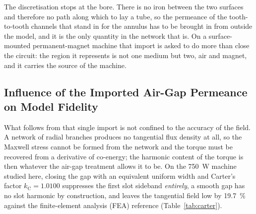 \documentclass[10pt,a4paper,twocolumn]{article}
\theoremstyle{plain}
\theoremstyle{remark}
\begin{document}
The discretisation stops at the bore. There is no iron between the two
surfaces and therefore no path along which to lay a tube, so the
permeance of the tooth-to-tooth channels that stand in for the annulus
has to be brought in from outside the model, and it is the only quantity
in the network that is. On a surface-mounted permanent-magnet machine
that import is asked to do more than close the circuit: the region it
represents is not one medium but two, air and magnet, and it carries the
source of the machine.

\subsection{Influence of the Imported Air-Gap Permeance on Model Fidelity}
\label{sub:cost}

What follows from that single import is not confined to the accuracy of
the field. A network of radial branches produces no tangential flux
density at all, so the Maxwell stress cannot be formed from the network
and the torque must be recovered from a derivative of co-energy; the
harmonic content of the torque is then whatever the air-gap treatment
allows it to be. On the \SI{750}{\watt} machine studied here, closing
the gap with an equivalent uniform width and Carter's factor
$k_{\mathrm{C}}=1.0100$ suppresses the first slot sideband
\emph{entirely}, a smooth gap has no slot harmonic by
construction, and leaves the tangential field low by
\SI{19.7}{\percent} against the finite-element analysis (FEA) reference
(Table~\ref{tab:carter}).
\end{document}
